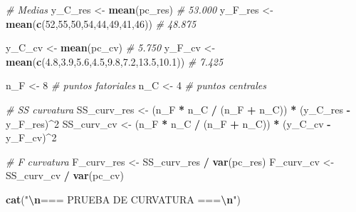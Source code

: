 \documentclass[
]{article}
\newenvironment{Shaded}{\begin{snugshade}}{\end{snugshade}}
\newcommand{\CommentTok}[1]{\textcolor[rgb]{0.56,0.35,0.01}{\textit{#1}}}
\newcommand{\DecValTok}[1]{\textcolor[rgb]{0.00,0.00,0.81}{#1}}
\newcommand{\FloatTok}[1]{\textcolor[rgb]{0.00,0.00,0.81}{#1}}
\newcommand{\FunctionTok}[1]{\textcolor[rgb]{0.13,0.29,0.53}{\textbf{#1}}}
\newcommand{\NormalTok}[1]{#1}
\newcommand{\OtherTok}[1]{\textcolor[rgb]{0.56,0.35,0.01}{#1}}
\newcommand{\SpecialCharTok}[1]{\textcolor[rgb]{0.81,0.36,0.00}{\textbf{#1}}}
\newcommand{\StringTok}[1]{\textcolor[rgb]{0.31,0.60,0.02}{#1}}
\begin{document}
\begin{Shaded}
\begin{Highlighting}[]
\CommentTok{\# Medias}
\NormalTok{y\_C\_res }\OtherTok{\textless{}{-}} \FunctionTok{mean}\NormalTok{(pc\_res)          }\CommentTok{\# 53.000}
\NormalTok{y\_F\_res }\OtherTok{\textless{}{-}} \FunctionTok{mean}\NormalTok{(}\FunctionTok{c}\NormalTok{(}\DecValTok{52}\NormalTok{,}\DecValTok{55}\NormalTok{,}\DecValTok{50}\NormalTok{,}\DecValTok{54}\NormalTok{,}\DecValTok{44}\NormalTok{,}\DecValTok{49}\NormalTok{,}\DecValTok{41}\NormalTok{,}\DecValTok{46}\NormalTok{))  }\CommentTok{\# 48.875}

\NormalTok{y\_C\_cv  }\OtherTok{\textless{}{-}} \FunctionTok{mean}\NormalTok{(pc\_cv)           }\CommentTok{\# 5.750}
\NormalTok{y\_F\_cv  }\OtherTok{\textless{}{-}} \FunctionTok{mean}\NormalTok{(}\FunctionTok{c}\NormalTok{(}\FloatTok{4.8}\NormalTok{,}\FloatTok{3.9}\NormalTok{,}\FloatTok{5.6}\NormalTok{,}\FloatTok{4.5}\NormalTok{,}\FloatTok{9.8}\NormalTok{,}\FloatTok{7.2}\NormalTok{,}\FloatTok{13.5}\NormalTok{,}\FloatTok{10.1}\NormalTok{))  }\CommentTok{\# 7.425}

\NormalTok{n\_F }\OtherTok{\textless{}{-}} \DecValTok{8}   \CommentTok{\# puntos fatoriales}
\NormalTok{n\_C }\OtherTok{\textless{}{-}} \DecValTok{4}   \CommentTok{\# puntos centrales}

\CommentTok{\# SS curvatura}
\NormalTok{SS\_curv\_res }\OtherTok{\textless{}{-}}\NormalTok{ (n\_F }\SpecialCharTok{*}\NormalTok{ n\_C }\SpecialCharTok{/}\NormalTok{ (n\_F }\SpecialCharTok{+}\NormalTok{ n\_C)) }\SpecialCharTok{*}\NormalTok{ (y\_C\_res }\SpecialCharTok{{-}}\NormalTok{ y\_F\_res)}\SpecialCharTok{\^{}}\DecValTok{2}
\NormalTok{SS\_curv\_cv  }\OtherTok{\textless{}{-}}\NormalTok{ (n\_F }\SpecialCharTok{*}\NormalTok{ n\_C }\SpecialCharTok{/}\NormalTok{ (n\_F }\SpecialCharTok{+}\NormalTok{ n\_C)) }\SpecialCharTok{*}\NormalTok{ (y\_C\_cv  }\SpecialCharTok{{-}}\NormalTok{ y\_F\_cv)}\SpecialCharTok{\^{}}\DecValTok{2}

\CommentTok{\# F curvatura}
\NormalTok{F\_curv\_res }\OtherTok{\textless{}{-}}\NormalTok{ SS\_curv\_res }\SpecialCharTok{/} \FunctionTok{var}\NormalTok{(pc\_res)}
\NormalTok{F\_curv\_cv  }\OtherTok{\textless{}{-}}\NormalTok{ SS\_curv\_cv  }\SpecialCharTok{/} \FunctionTok{var}\NormalTok{(pc\_cv)}

\FunctionTok{cat}\NormalTok{(}\StringTok{"}\SpecialCharTok{\textbackslash{}n}\StringTok{=== PRUEBA DE CURVATURA ===}\SpecialCharTok{\textbackslash{}n}\StringTok{"}\NormalTok{)}
\end{Highlighting}
\end{Shaded}
\end{document}
